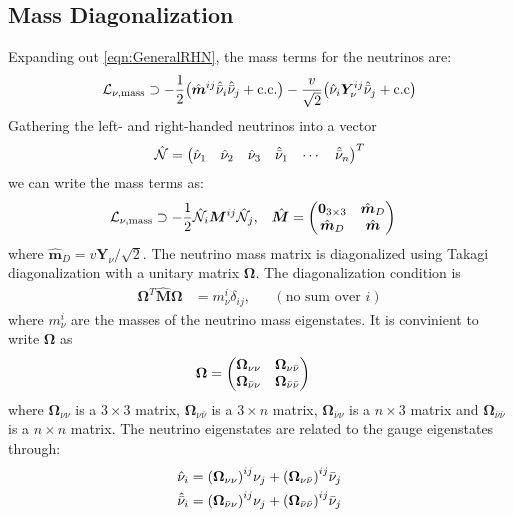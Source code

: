 \documentclass[a4paper,11pt]{article} \pdfoutput=1
\newcommand{\rhn}{\bar{\nu}}
\newcommand{\cL}{\mathcal{L}}
\newcommand{\cN}{\mathcal{N}}
\newcommand{\OmegaVVb}{\bm{\Omega}_{\nu\nu}}
\newcommand{\OmegaVNb}{\bm{\Omega}_{\nu\rhn}}
\newcommand{\OmegaNVb}{\bm{\Omega}_{\rhn\nu}}
\newcommand{\OmegaNNb}{\bm{\Omega}_{\rhn\rhn}}
\begin{document}
\subsection{Mass Diagonalization}
Expanding out \ref{eqn:GeneralRHN}, the mass terms for the neutrinos are:
\begin{align}\label{eqn:RHNMass}
	\cL_{\nu,\mathrm{mass}}\supset
	-\frac{1}{2}\qty(\hat{\bm{m}}^{ij}\hat{\rhn}_i\hat{\rhn}_j + \mathrm{c.c.})
	- \frac{v}{\sqrt{2}}\qty(\hat{\nu}_{i}\bm{Y}^{ij}_{\nu}\hat{\rhn}_{j} + \mathrm{c.c})
\end{align}
Gathering the left- and right-handed neutrinos into a vector
\begin{align}
	\hat{\cN} = \mqty(\hat{\nu}_1 & \hat{\nu}_2 & \hat{\nu}_3 & \hat{\rhn}_1 & \cdots & \hat{\rhn}_n)^{T}
\end{align}
we can write the mass terms as:
\begin{align}\label{eqn:RHNMassMatrix}
	\cL_{\nu,\mathrm{mass}}
	                  & \supset
	-\frac{1}{2}\hat{\cN}_{i}\bm{M}^{ij}\hat{\cN}_j,
	                  &
	\hat{\bm{M}}      & = \mqty(
	\bm{0}_{3\times3} & \hat{\bm{m}}_{D} \\
	\hat{\bm{m}}_{D}  & \hat{\bm{m}}
	)
\end{align}
where \(\hat{\bm{m}}_{D} = v\bm{Y}_{\nu}/\sqrt{2}\). The neutrino mass matrix is diagonalized
using Takagi diagonalization with a unitary matrix \(\bm{\Omega}\). The diagonalization condition
is
\begin{align}\label{eqn:DiagCond}
	\bm{\Omega}^{T}\hat{\bm{M}}\bm{\Omega} & = m^{i}_{\nu}\delta_{ij}, &  & (\text{no sum over } i)
\end{align}
where \(m^{i}_{\nu}\) are the masses of the neutrino mass eigenstates. It is convinient to
write \(\bm{\Omega}\) as
\begin{align}\label{eqn:OmegaDef}
	\bm{\Omega} & = \mqty(\OmegaVVb & \OmegaVNb \\ \OmegaNVb & \OmegaNNb)
\end{align}
where \(\OmegaVVb\) is a \(3\times3\) matrix, \(\OmegaVNb\) is a \(3\times n\) matrix,
\(\OmegaNVb\) is a \(n\times3\) matrix and \(\OmegaNNb\) is a \(n\times n\) matrix.
The neutrino eigenstates are related to the gauge eigenstates through:
\begin{align}
	\hat{\nu}_{i}  & = \qty(\OmegaVVb)^{ij}\nu_j + \qty(\OmegaVNb)^{ij}\rhn_j \\
	\hat{\rhn}_{i} & = \qty(\OmegaNVb)^{ij}\nu_j + \qty(\OmegaNNb)^{ij}\rhn_j
\end{align}
\end{document}
